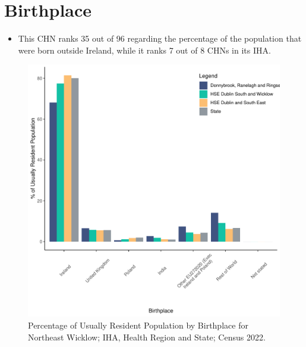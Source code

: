 \documentclass{article}
\begin{document}
\section{Birthplace}\label{sect:Birth}
\begin{itemize}
\item This CHN ranks  35 out of 96 regarding the percentage of the population that were born outside Ireland, while it ranks  7 out of 8 CHNs in its IHA.
\end{itemize}
\begin{figure}[H]
	\centering
	\includegraphics[width = 130mm]{../figures/BirthED.pdf}
	\caption{Percentage of Usually Resident Population by Birthplace for Northeast Wicklow; IHA, Health Region and State; Census 2022.}
	\label{fig:vbnv}
	\end{figure}
	
\end{document}
